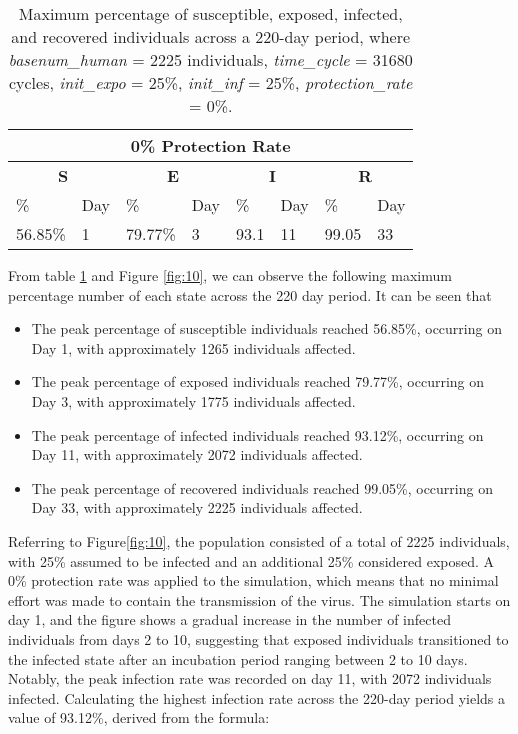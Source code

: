 \begin{table} [H]
	\centering
	\begin{tabular}{|l|l|l|l|l|l|l|l|}
		
		\hline
		\multicolumn{8}{|c|}{\textbf{0\% Protection Rate}}\\
		\hline
		\multicolumn{2}{|c|}{\textbf{S}} &  \multicolumn{2}{c|}{\textbf{E}}&  \multicolumn{2}{c|}{\textbf{I}}&  \multicolumn{2}{c|}{\textbf{R}}\\
		\hline
		\%& Day & \% & Day & \%  & Day & \% & Day \\
		\hline
		56.85\% & 1 & 79.77\%  & 3 & 93.1  & 11 & 99.05  &33 \\
		\hline
	\end{tabular}
	\caption{Maximum percentage of susceptible, exposed, infected, and recovered individuals across a 220-day period, where \textit{basenum\_human} = 2225 individuals, \textit{time\_cycle} = 31680 cycles, \textit{init\_expo} = 25\%, \textit{init\_inf} = 25\%,  \textit{protection\_rate} = 0\%.}
	\label{PR1_Max}
\end{table}
From table \ref{PR1_Max} and Figure \ref{fig:10}, we can observe the following maximum percentage number of each state across the 220 day period. It can be seen that 
\begin{itemize}
	\item The peak percentage of susceptible individuals reached 56.85\%, occurring on Day 1, with approximately 1265 individuals affected.
	\item The peak percentage of exposed individuals reached 79.77\%, occurring on Day 3, with approximately 1775 individuals affected.
	\item The peak percentage of infected individuals reached 93.12\%, occurring on Day 11, with approximately 2072 individuals affected.
	\item The peak percentage of recovered individuals reached 99.05\%, occurring on Day 33, with approximately 2225 individuals affected.
\end{itemize}

Referring to Figure\ref{fig:10}, the population consisted of a total of 2225 individuals, with 25\% assumed to be infected and an additional 25\% considered exposed. A 0\% protection rate was applied to the simulation, which means that no minimal effort was made to contain the transmission of the virus. The simulation starts on day 1, and the figure shows a gradual increase in the number of infected individuals from days 2 to 10, suggesting that exposed individuals transitioned to the infected state after an incubation period ranging between 2 to 10 days. Notably, the peak infection rate was recorded on day 11, with 2072 individuals infected. Calculating the highest infection rate across the 220-day period yields a value of 93.12\%, derived from the formula:

